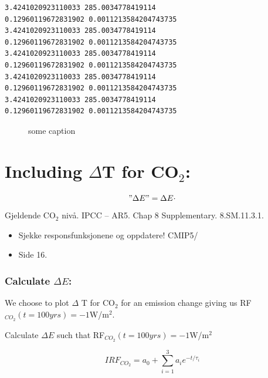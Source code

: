 \documentclass[11pt]{article}
\providecommand{\tightlist}{%
      \setlength{\itemsep}{0pt}\setlength{\parskip}{0pt}}
\begin{document}
    \begin{Verbatim}[commandchars=\\\{\}]
3.4241020923110033 285.0034778419114
0.12960119672831902 0.0011213584204743735
3.4241020923110033 285.0034778419114
0.12960119672831902 0.0011213584204743735
3.4241020923110033 285.0034778419114
0.12960119672831902 0.0011213584204743735
3.4241020923110033 285.0034778419114
0.12960119672831902 0.0011213584204743735
3.4241020923110033 285.0034778419114
0.12960119672831902 0.0011213584204743735
    \end{Verbatim}

    \begin{figure}
        \begin{center}\end{center}
        \caption{some caption}
        \label{fig:some}
    \end{figure}
    
    \hypertarget{including-deltat-for-co_2}{%
\section{\texorpdfstring{Including \(\Delta\)T for
CO\(_2\):}{Including \textbackslash DeltaT for CO\_2:}}\label{including-deltat-for-co_2}}

    \["\Delta E" = \Delta E \cdot \] Gjeldende CO\(_2\) nivå. IPCC -- AR5.
Chap 8 Supplementary. 8.SM.11.3.1.

\begin{itemize}
\tightlist
\item
  Sjekke responsfunksjonene og oppdatere! CMIP5/
\item
  Side 16.
\end{itemize}

    \hypertarget{calculate-delta-e}{%
\subsubsection{\texorpdfstring{Calculate
\(\Delta E\):}{Calculate \textbackslash Delta E:}}\label{calculate-delta-e}}

We choose to plot \(\Delta\) T for CO\(_2\) for an emission change
giving us RF\(_{CO_2}(t=100yrs)=-1\)W/m\(^2\).

Calculate \(\Delta E\) such that RF\(_{CO_2}(t=100yrs)=-1\)W/m\(^2\)

    \[IRF_{CO_2} = a_0 + \sum_{i=1}^{3} a_i e^{-t/\tau_i}\]
\end{document}
